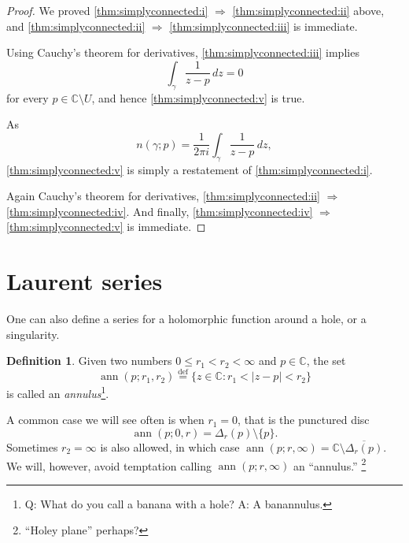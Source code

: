 \documentclass[12pt,openany]{book}
\newcommand{\ann}{\operatorname{ann}}
\newcommand{\sabs}[1]{\lvert {#1} \rvert}
\newcommand{\C}{{\mathbb{C}}}
\newcommand{\myindex}[1]{#1\index{#1}}
\theoremstyle{plain}
\theoremstyle{remark}
\theoremstyle{definition}
\newtheorem{defn}[thm]{Definition}
\theoremstyle{exercise}
\theoremstyle{example}
\begin{document}
\begin{proof}
We proved
\ref{thm:simplyconnected:i} $\Rightarrow$
\ref{thm:simplyconnected:ii} above,
and
\ref{thm:simplyconnected:ii} $\Rightarrow$
\ref{thm:simplyconnected:iii} is immediate.

Using Cauchy's theorem for derivatives,
\ref{thm:simplyconnected:iii} implies
\begin{equation*}
\int_\gamma \frac{1}{z-p} \, dz = 0 
\end{equation*}
for every $p \in \C \setminus U$,
and hence 
\ref{thm:simplyconnected:v} is true.

As 
\begin{equation*}
n(\gamma;p) = 
\frac{1}{2\pi i}
\int_\gamma \frac{1}{z-p} \, dz ,
\end{equation*}
\ref{thm:simplyconnected:v} is simply a restatement of
\ref{thm:simplyconnected:i}.

Again Cauchy's theorem for derivatives,
\ref{thm:simplyconnected:ii} $\Rightarrow$
\ref{thm:simplyconnected:iv}.
And finally, \ref{thm:simplyconnected:iv} $\Rightarrow$
\ref{thm:simplyconnected:v} is immediate.
\end{proof}


\section{Laurent series}

One can also define a series for a holomorphic function around a hole, or a singularity.

\begin{defn}
Given two numbers $0 \leq r_1 < r_2 < \infty$ and $p \in \C$, the set
\begin{equation*}
\ann(p;r_1,r_2)
\overset{\text{def}}{=}
\{ z \in \C : r_1 < \sabs{z - p} < r_2 \}
\end{equation*}
is called an \emph{\myindex{annulus}}\footnote{%
Q: What do you call a banana with a hole?
A: A banannulus.}.
\end{defn}

A common case we will see often is when $r_1 = 0$, that is
the punctured disc
\begin{equation*}
\ann(p;0,r) = \Delta_r(p) \setminus \{ p \} .
\end{equation*}
Sometimes $r_2 = \infty$ is also allowed, in which case
$\ann(p;r,\infty) = \C \setminus \overline{\Delta_{r}(p)}$.  We will,
however, avoid temptation calling $\ann(p;r,\infty)$ an ``annulus.''%
\footnote{``Holey plane'' perhaps?}
\end{document}
